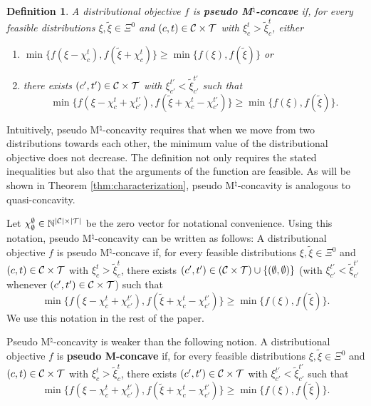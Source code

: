 \documentclass[12pt]{amsart}
\newtheorem{definition}{Definition}
\theoremstyle{remark}
\def\T{\mathcal{T}} \def\calt{\mathcal{T}}
\begin{document}
\begin{definition}\label{def:pmc}
A distributional objective $f$ is \textbf{pseudo M$^{\natural}$-concave} if, for every feasible distributions
$\xi,\tilde{\xi} \in \Xi^0$ and $(c,t) \in \calc \times \calt$ with $\xi_c^t>\tilde{\xi}_c^t$, either
\begin{enumerate}
\item $\min \{f(\xi-\chi_c^t), f(\tilde{\xi}+\chi_c^t)\} \geq \min \{f(\xi),f(\tilde{\xi})\}$ or
\item there exists $(c',t') \in \calc \times \calt$ with $\xi_{c'}^{t'}<\tilde{\xi}_{c'}^{t'}$ such that
\begin{equation*}
  \min \{f(\xi-\chi_c^t+\chi_{c'}^{t'}), f(\tilde{\xi}+\chi_c^t-\chi_{c'}^{t'})\} \geq \min \{f(\xi),f(\tilde{\xi})\}.
\end{equation*}
\end{enumerate}
\end{definition}
Intuitively, pseudo M$^{\natural}$-concavity requires that when we move from two distributions towards each other, the minimum value
of the distributional objective does not decrease. The definition not only requires the stated inequalities but also that the arguments of
the function are feasible. As will be shown in Theorem \ref{thm:characterization}, pseudo M$^{\natural}$-concavity is analogous to quasi-concavity.

Let $\chi_{\emptyset}^{\emptyset} \in \mathbb N^{|\C|\times |\T|}$ be the
zero vector for notational convenience. Using this notation, pseudo M$^{\natural}$-concavity can be written as follows:
A distributional objective $f$ is pseudo M$^{\natural}$-concave if, for every feasible distributions
$\xi,\tilde{\xi} \in \Xi^0$ and $(c,t) \in \calc \times \calt$ with $\xi_c^t>\tilde{\xi}_c^t$, there exists
$(c',t') \in (\calc \times \calt)\cup \{(\emptyset,\emptyset)\}$ (with $\xi_{c'}^{t'}<\tilde{\xi}_{c'}^{t'}$ whenever $(c',t')\in \calc \times \calt$) such that
\begin{equation*}
  \min \{f(\xi-\chi_c^t+\chi_{c'}^{t'}), f(\tilde{\xi}+\chi_c^t-\chi_{c'}^{t'})\} \geq \min \{f(\xi),f(\tilde{\xi})\}.
\end{equation*}
We use this notation in the rest of the paper.

Pseudo M$^{\natural}$-concavity is weaker than the following notion.
A distributional objective $f$ is \textbf{pseudo M-concave} if, for every feasible distributions
$\xi, \tilde{\xi} \in \Xi^0$ and $(c,t) \in \calc \times \calt$ with $\xi_c^t>\tilde{\xi}_c^t$,
there exists $(c',t') \in \calc \times \calt$  with $\xi_{c'}^{t'}<\tilde{\xi}_{c'}^{t'}$ such that
\[\min \{f(\xi-\chi_c^t+\chi_{c'}^{t'}), f(\tilde{\xi}+\chi_c^t-\chi_{c'}^{t'})\} \geq \min \{f(\xi),f(\tilde{\xi})\}.\]
\end{document}
